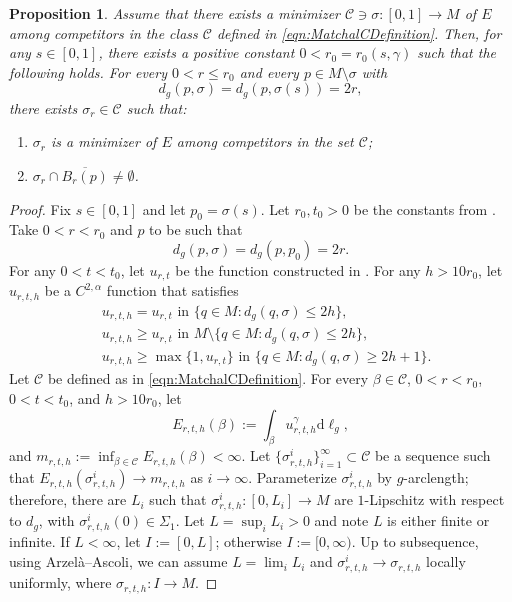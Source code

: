 \documentclass[12pt,a4paper,reqno]{amsart}
\newtheorem{proposition}{Proposition}
\theoremstyle{definition}
\renewcommand{\leq}{\leqslant}
\renewcommand{\geq}{\geqslant}
\begin{document}
{\begin{proposition}
        Assume that  there exists a minimizer $\mathcal{C}\ni\sigma:[0,1]\to M$ of $E$ among competitors in the class $\mathcal{C}$ defined in \eqref{eqn:MatchalCDefinition}. Then, for any $s \in [0,1]$, there exists a positive constant $0<r_0 = r_0(s,\gamma)$ such that the following holds. For every $0 < r \leq r_0$ and every $p \in M \setminus \sigma$ with
\[
d_g(p,\sigma) = d_g(p,\sigma(s)) = 2r,
\]
there exists $\sigma_r\in \mathcal{C}$ such that:
\begin{enumerate}
    \item $\sigma_r$ is a minimizer of $E$ among competitors in the set $\mathcal{C}$;
    \item $\sigma_r\cap \overline{B_r(p)}\neq\emptyset$.
\end{enumerate}
\end{proposition}
\begin{proof}
    Fix $s\in [0,1]$ and let $p_0=\sigma(s)$. Let $r_0,t_0>0$ be the constants from . Take $0<r<r_0$ and $p$ to be such that
\[
d_g(p,\sigma) = d_g(p,p_0) = 2r.
\]
For any $0<t<t_0$, let $u_{r,t}$ be the function constructed in . For any $h>10r_0$, let $u_{r,t,h}$ be a $C^{2,\alpha}$ function that satisfies
\begin{align*}
    &u_{r,t,h} = u_{r,t} \text{ in }  \{q\in M : d_g(q,\sigma)\leq 2h\},\\
    &u_{r,t,h} \geq u_{r,t} \text{ in }  M\setminus\{q\in M : d_g(q,\sigma)\leq 2h\},\\
    & u_{r,t,h} \geq \max\{1,u_{r,t}\} \text{ in }  \{q\in M : d_g(q,\sigma)\geq 2h+1\}.
\end{align*}
Let $\mathcal{C}$ be defined as in \eqref{eqn:MatchalCDefinition}.
 For every $\beta\in\mathcal{C}$, $0<r<r_0$, $0<t<t_0$, and $h>10r_0$, let 
 $$
 E_{r,t,h}(\beta):=\int_\beta u^\gamma_{r,t,h}\mathrm{d}\ell_g,
 $$ and $m_{r,t,h}:=\inf_\mathcal{\beta\in C} E_{r,t,h}(\beta)<\infty$. Let $\{\sigma^i_{r,t,h}\}_{i=1}^\infty \subset \mathcal{C}$ be a sequence such that $E_{r,t,h}(\sigma^i_{r,t,h}) \to m_{r,t,h}$ as $i\to \infty$. Parameterize $\sigma^i_{r,t,h}$ by $g$-arclength; therefore, there are $L_i$ such that $\sigma^i_{r,t,h}:[0,L_i]\to M$ are $1$-Lipschitz with respect to $d_g$, with $\sigma_{r,t,h}^i(0)\in\Sigma_1$. Let $L=\sup_i L_i>0$ and note $L$ is either finite or infinite. If $L<\infty$, let $I:=[0,L]$; otherwise $I:=[0,\infty)$. Up to subsequence, using Arzelà--Ascoli, we can assume $L=\lim_i L_i$ and $\sigma_{r,t,h}^i\to \sigma_{r,t,h}$ locally uniformly, where $\sigma_{r,t,h}:I\to M$.


\end{proof}}
\end{document}
